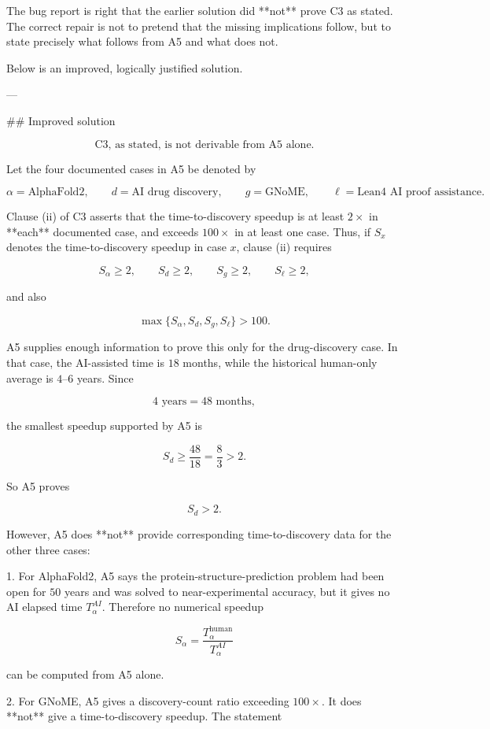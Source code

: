 The bug report is right that the earlier solution did **not** prove C3 as stated. The correct repair is not to pretend that the missing implications follow, but to state precisely what follows from A5 and what does not.

Below is an improved, logically justified solution.

---

## Improved solution

\[
\boxed{\text{C3, as stated, is not derivable from A5 alone.}}
\]

Let the four documented cases in A5 be denoted by

\[
\alpha=\text{AlphaFold2},\qquad
d=\text{AI drug discovery},\qquad
g=\text{GNoME},\qquad
\ell=\text{Lean4 AI proof assistance}.
\]

Clause (ii) of C3 asserts that the time-to-discovery speedup is at least \(2\times\) in **each** documented case, and exceeds \(100\times\) in at least one case. Thus, if \(S_x\) denotes the time-to-discovery speedup in case \(x\), clause (ii) requires

\[
S_\alpha\ge 2,\qquad S_d\ge 2,\qquad S_g\ge 2,\qquad S_\ell\ge 2,
\]

and also

\[
\max\{S_\alpha,S_d,S_g,S_\ell\}>100.
\]

A5 supplies enough information to prove this only for the drug-discovery case. In that case, the AI-assisted time is \(18\) months, while the historical human-only average is \(4\)--\(6\) years. Since

\[
4\text{ years}=48\text{ months},
\]

the smallest speedup supported by A5 is

\[
S_d\ge \frac{48}{18}=\frac{8}{3}>2.
\]

So A5 proves

\[
S_d>2.
\]

However, A5 does **not** provide corresponding time-to-discovery data for the other three cases:

1. For AlphaFold2, A5 says the protein-structure-prediction problem had been open for \(50\) years and was solved to near-experimental accuracy, but it gives no AI elapsed time \(T_\alpha^{AI}\). Therefore no numerical speedup

   \[
   S_\alpha=\frac{T_\alpha^{\text{human}}}{T_\alpha^{AI}}
   \]

   can be computed from A5 alone.

2. For GNoME, A5 gives a discovery-count ratio exceeding \(100\times\). It does **not** give a time-to-discovery speedup. The statement

